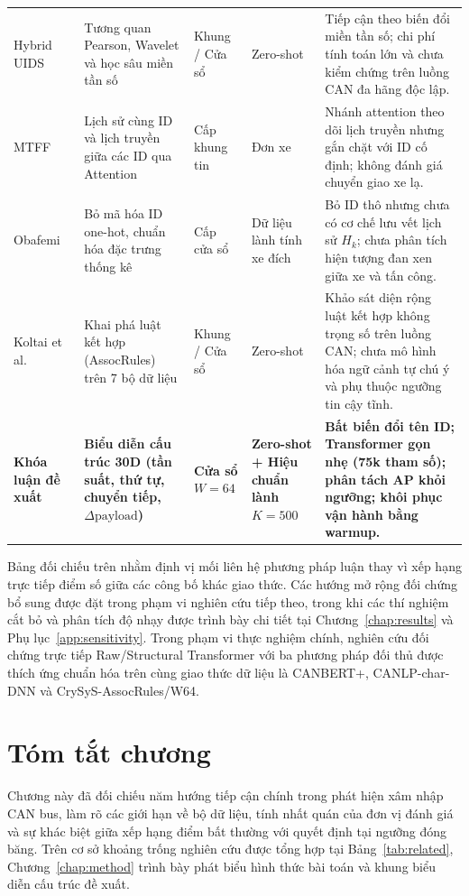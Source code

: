\documentclass[12pt, a4paper, reqno, oneside]{book}
\begin{document}
\begin{longtable}{P{2.5cm}P{2.9cm}P{1.8cm}P{2.2cm}P{5.1cm}}
Hybrid UIDS~\cite{s26051489} & Tương quan Pearson, Wavelet và học sâu miền tần số & Khung / Cửa sổ & Zero-shot & Tiếp cận theo biến đổi miền tần số; chi phí tính toán lớn và chưa kiểm chứng trên luồng CAN đa hãng độc lập.\\
MTFF~\cite{dong2026mtff} & Lịch sử cùng ID và lịch truyền giữa các ID qua Attention & Cấp khung tin & Đơn xe & Nhánh attention theo dõi lịch truyền nhưng gắn chặt với ID cố định; không đánh giá chuyển giao xe lạ.\\
Obafemi~\cite{obafemi2026travel} & Bỏ mã hóa ID one-hot, chuẩn hóa đặc trưng thống kê & Cấp cửa sổ & Dữ liệu lành tính xe đích & Bỏ ID thô nhưng chưa có cơ chế lưu vết lịch sử $H_k$; chưa phân tích hiện tượng đan xen giữa xe và tấn công.\\
Koltai et al.~\cite{koltai2026trust} & Khai phá luật kết hợp (AssocRules) trên 7 bộ dữ liệu & Khung / Cửa sổ & Zero-shot & Khảo sát diện rộng luật kết hợp không trọng số trên luồng CAN; chưa mô hình hóa ngữ cảnh tự chú ý và phụ thuộc ngưỡng tin cậy tĩnh.\\
\textbf{Khóa luận đề xuất} & \textbf{Biểu diễn cấu trúc 30D (tần suất, thứ tự, chuyển tiếp, $\Delta\text{payload}$)} & \textbf{Cửa sổ $W=64$} & \textbf{Zero-shot + Hiệu chuẩn lành $K=500$} & \textbf{Bất biến đổi tên ID; Transformer gọn nhẹ (75k tham số); phân tách AP khỏi ngưỡng; khôi phục vận hành bằng warmup.}\\\bottomrule
\end{longtable}
Bảng đối chiếu trên nhằm định vị mối liên hệ phương pháp luận thay vì xếp hạng trực tiếp điểm số giữa các công bố khác giao thức. Các hướng mở rộng đối chứng bổ sung được đặt trong phạm vi nghiên cứu tiếp theo, trong khi các thí nghiệm cắt bỏ và phân tích độ nhạy được trình bày chi tiết tại Chương~\ref{chap:results} và Phụ lục~\ref{app:sensitivity}. Trong phạm vi thực nghiệm chính, nghiên cứu đối chứng trực tiếp Raw/Structural Transformer với ba phương pháp đối thủ được thích ứng chuẩn hóa trên cùng giao thức dữ liệu là CANBERT+, CANLP-char-DNN và CrySyS-AssocRules/W64.

\section{Tóm tắt chương}
Chương này đã đối chiếu năm hướng tiếp cận chính trong phát hiện xâm nhập CAN bus, làm rõ các giới hạn về bộ dữ liệu, tính nhất quán của đơn vị đánh giá và sự khác biệt giữa xếp hạng điểm bất thường với quyết định tại ngưỡng đóng băng. Trên cơ sở khoảng trống nghiên cứu được tổng hợp tại Bảng~\ref{tab:related}, Chương~\ref{chap:method} trình bày phát biểu hình thức bài toán và khung biểu diễn cấu trúc đề xuất.
\end{document}
